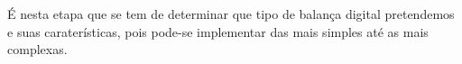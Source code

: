 É nesta etapa que se tem de determinar que tipo de balança digital pretendemos e suas caraterísticas, pois pode-se implementar das mais simples até as mais complexas.
\begin{comment}
Measurement devices need to be robust to withstand changing environmental influences such as temperature, vibration, and humidity, and they must also provide reliable measurement over long periods of time. Mechanical interfacing of the devices can be difficult and can influence final measurement. The forces and torques may change rapidly, and so the devices must have adequate frequency and transient responses.\\
There are several methods to measure forces and torques. Often, the force to be measured is converted into a change in length of a spring element. The change in dimensions is subsequently measured by a sensor, for example, a piezoresistive, a capacitive or a resonant sensor.\\
It is not so surprising, therefore, that most force and torque measurement devices utilize the long and well-established resistance strain gauge technology.\\
Unfortunately, the metallic resistance strain gauge is relatively insensitive such that in use it is normal to obtain only several millivolts of analog voltage before amplification, and the gauges must not be significantly overstrained. The rangeability and overloading capabilities are seriously restricted. Also, the gauges consume relatively high electrical power (e.g., 250 mW).\\
In general, measurement instrumentation now needs smaller sensing devices of lower power consumption and with greater rangeability and overload capabilities.\\
Greater compatibility with digital microelectronics is highly desirable. Noncontact and wireless operation is sometimes needed, and in some cases batteryless devices are desirable. Production of measurement devices using metallic resistance strain gauges can be relatively labor intensive and skilled, and may require relatively ineffi-cient calibration procedures.\\
In recent years some instrument manufacturers of force and torque measure-ment devices have moved away from using resistance strain gauges. Already, one leading manufacturer of weighing machines for retail and industrial applications now uses metallic and quartz resonant tuning fork technologies, and smaller compa-nies have established niche markets using surface acoustic wave (SAW) technology, optical technology, and magnetoelastic technology.\\

\end{comment}
